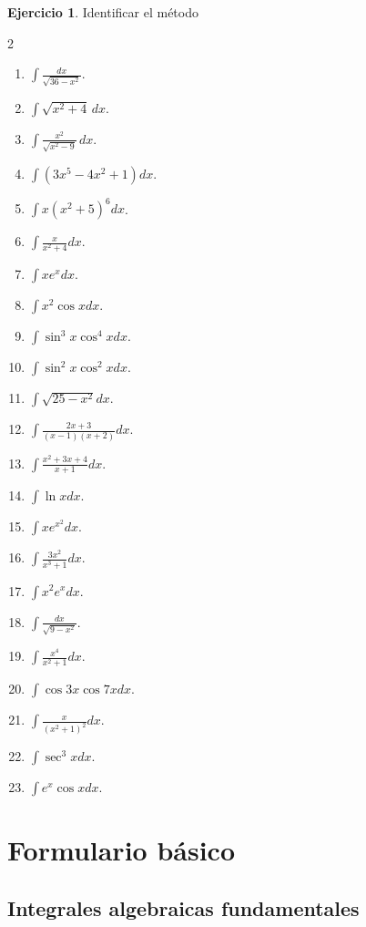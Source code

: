 \documentclass[12pt]{article}
\theoremstyle{definition}
\newtheorem{Ejer}[teorema]{Ejercicio}
\theoremstyle{remark}
\begin{document}
\begin{Ejer}{Identificar el método}
\begin{multicols}{2}
\begin{enumerate}[resume=integrales]
\item $\displaystyle \int\frac{dx}{\sqrt{36-x^2}}$.
\item $\displaystyle \int\sqrt{x^2+4}\,dx$.
\item $\displaystyle \int\frac{x^2}{\sqrt{x^2-9}}\,dx$.
\item $\int(3x^5-4x^2+1)dx$.
\item $\int x(x^2+5)^6dx$.
\item $\int\frac{x}{x^2+4}dx$.
\item $\int xe^xdx$.
\item $\int x^2\cos xdx$.
\item $\int\sin^3x\cos^4xdx$.
\item $\int\sin^2x\cos^2xdx$.
\item $\int\sqrt{25-x^2}dx$.
\item $\int\frac{2x+3}{(x-1)(x+2)}dx$.
\item $\int\frac{x^2+3x+4}{x+1}dx$.
\item $\int\ln xdx$.
\item $\int xe^{x^2}dx$.
\item $\int\frac{3x^2}{x^3+1}dx$.
\item $\int x^2e^xdx$.
\item $\int\frac{dx}{\sqrt{9-x^2}}$.
\item $\int\frac{x^4}{x^2+1}dx$.
\item $\int\cos3x\cos7xdx$.
\item $\int\frac{x}{(x^2+1)^2}dx$.
\item $\int\sec^3x dx$.
\item $\int e^x\cos xdx$.
\end{enumerate}
\end{multicols}
\end{Ejer}

\section{Formulario b\'asico}


\subsection*{Integrales algebraicas fundamentales}
\end{document}
